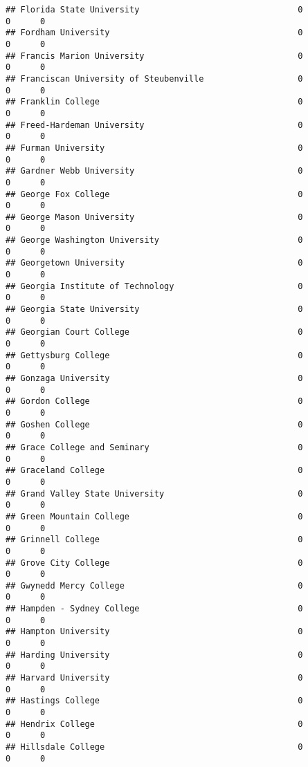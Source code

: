 \documentclass[
]{article}
\begin{document}
\begin{verbatim}
## Florida State University                                0          0      0
## Fordham University                                      0          0      0
## Francis Marion University                               0          0      0
## Franciscan University of Steubenville                   0          0      0
## Franklin College                                        0          0      0
## Freed-Hardeman University                               0          0      0
## Furman University                                       0          0      0
## Gardner Webb University                                 0          0      0
## George Fox College                                      0          0      0
## George Mason University                                 0          0      0
## George Washington University                            0          0      0
## Georgetown University                                   0          0      0
## Georgia Institute of Technology                         0          0      0
## Georgia State University                                0          0      0
## Georgian Court College                                  0          0      0
## Gettysburg College                                      0          0      0
## Gonzaga University                                      0          0      0
## Gordon College                                          0          0      0
## Goshen College                                          0          0      0
## Grace College and Seminary                              0          0      0
## Graceland College                                       0          0      0
## Grand Valley State University                           0          0      0
## Green Mountain College                                  0          0      0
## Grinnell College                                        0          0      0
## Grove City College                                      0          0      0
## Gwynedd Mercy College                                   0          0      0
## Hampden - Sydney College                                0          0      0
## Hampton University                                      0          0      0
## Harding University                                      0          0      0
## Harvard University                                      0          0      0
## Hastings College                                        0          0      0
## Hendrix College                                         0          0      0
## Hillsdale College                                       0          0      0

\end{verbatim}
\end{document}
